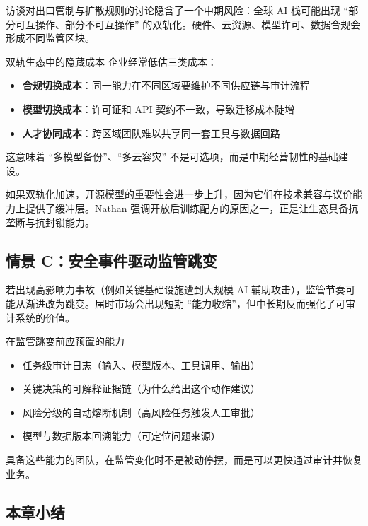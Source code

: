 \documentclass[a4paper]{article}
\begin{document}
访谈对出口管制与扩散规则的讨论隐含了一个中期风险：全球 AI 栈可能出现 ``部分可互操作、部分不可互操作'' 的双轨化。硬件、云资源、模型许可、数据合规会形成不同监管区块。

\begin{warningbox}{双轨生态中的隐藏成本}
企业经常低估三类成本：
\begin{itemize}
    \item \textbf{合规切换成本}：同一能力在不同区域要维护不同供应链与审计流程
    \item \textbf{模型切换成本}：许可证和 API 契约不一致，导致迁移成本陡增
    \item \textbf{人才协同成本}：跨区域团队难以共享同一套工具与数据回路
\end{itemize}

这意味着 ``多模型备份''、``多云容灾'' 不是可选项，而是中期经营韧性的基础建设。
\end{warningbox}

如果双轨化加速，开源模型的重要性会进一步上升，因为它们在技术兼容与议价能力上提供了缓冲层。Nathan 强调开放后训练配方的原因之一，正是让生态具备抗垄断与抗封锁能力。

\subsection{情景 C：安全事件驱动监管跳变}

若出现高影响力事故（例如关键基础设施遭到大规模 AI 辅助攻击），监管节奏可能从渐进改为跳变。届时市场会出现短期 ``能力收缩''，但中长期反而强化了可审计系统的价值。

\begin{importantbox}{在监管跳变前应预置的能力}
\begin{itemize}
    \item 任务级审计日志（输入、模型版本、工具调用、输出）
    \item 关键决策的可解释证据链（为什么给出这个动作建议）
    \item 风险分级的自动熔断机制（高风险任务触发人工审批）
    \item 模型与数据版本回溯能力（可定位问题来源）
\end{itemize}

具备这些能力的团队，在监管变化时不是被动停摆，而是可以更快通过审计并恢复业务。
\end{importantbox}

\subsection{本章小结}
\end{document}
